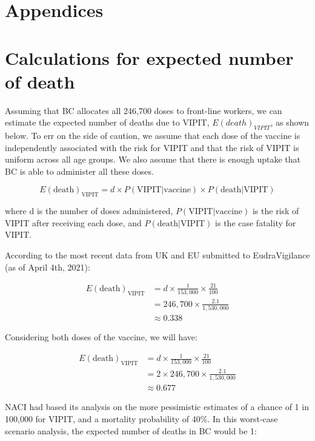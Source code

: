 \section{Appendices}

\appendix

\section{Calculations for expected number of death}

Assuming that BC allocates all 246,700 doses to front-line workers, we can estimate the expected number of deaths due to VIPIT, $E(death)_{VIPIT}$, as shown below. To err on the side of caution, we assume that each dose of the vaccine is independently associated with the risk for VIPIT and that the risk of VIPIT is uniform across all age groups. We also assume that there is enough uptake that BC is able to administer all these doses.

$$
E(\text{death})_{\text{VIPIT}}  = d \times P(\text{VIPIT}|\text{vaccine}) \times P(\text{death}|\text{VIPIT})
$$

where d is the number of doses administered,  $P(\text{VIPIT}|\text{vaccine})$ is the risk of VIPIT after receiving each dose, and $P(\text{death}|\text{VIPIT})$ is the case fatality for VIPIT. 

According to the most recent data from UK and EU submitted to EudraVigilance (as of April 4th, 2021):

$$
\begin{aligned}
E(\text{death})_{\text{VIPIT}} & = d \times \frac{1}{153,000} \times \frac{21}{100} \\
& = 246,700 \times \frac{2.1}{1,530,000} \\
& \approx 0.338
\end{aligned}
$$

Considering both doses of the vaccine, we will have:

$$
\begin{aligned}
E(\text{death})_{\text{VIPIT}} & = d \times \frac{1}{153,000} \times \frac{21}{100} \\
& = 2 \times 246,700 \times \frac{2.1}{1,530,000} \\
& \approx 0.677
\end{aligned}
$$

NACI had based its analysis on the more pessimistic estimates of a chance of 1 in 100,000 for VIPIT, and a mortality probability of 40\%. In this worst-case scenario analysis, the expected number of deaths in BC would be 1:

